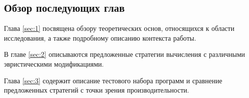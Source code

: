 \documentclass[../thesis.tex]{subfiles}
\begin{document}
\subsection*{Обзор последующих глав}

Глава \ref{sec:1} посвящена обзору теоретических основ, относящихся к области исследования, а также подробному описанию контекста работы.

В главе \ref{sec:2} описываются предложенные стратегии вычисления с различными эвристическими модификациями.

Глава \ref{sec:3} содержит описание тестового набора программ и сравнение предложенных стратегий с точки зрения производительности.
\end{document}
